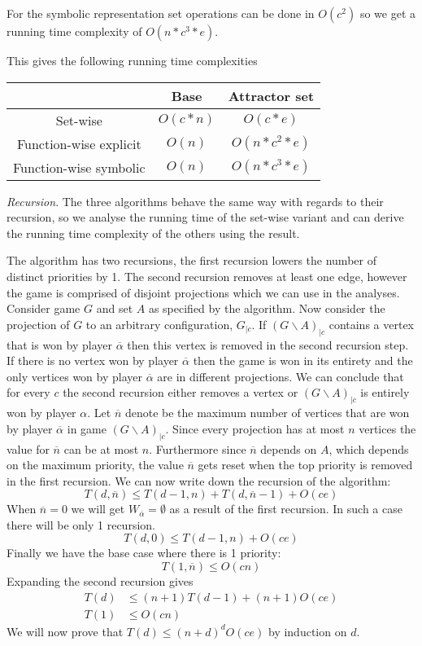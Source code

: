 For the symbolic representation set operations can be done in $O(c^2)$ so we get a running time complexity of $O(n*c^3*e)$.

This gives the following running time complexities\\
\begin{center}
	\begin{tabular}{|c|c|c|}
		\hline 
		& Base & Attractor set \\ 
		\hline 
		Set-wise & $O(c*n)$ & $O(c*e)$  \\ 
		\hline 
		Function-wise explicit & $O(n)$ &  $O(n*c^2*e)$ \\ 
		\hline 
		Function-wise symbolic & $O(n)$ &  $O(n* c^3*e)$ \\ 
		\hline 
	\end{tabular} 
\end{center}

\textit{Recursion}. The three algorithms behave the same way with regards to their recursion, so we analyse the running time of the set-wise variant and can derive the running time complexity of the others using the result.

The algorithm has two recursions, the first recursion lowers the number of distinct priorities by 1. The second recursion removes at least one edge, however the game is comprised of disjoint projections which we can use in the analyses. Consider game $G$ and set $A$ as specified by the algorithm. Now consider the projection of $G$ to an arbitrary configuration, $G_{|c}$. If $(G\backslash A)_{|c}$ contains a vertex that is won by player $\overline{\alpha}$ then this vertex is removed in the second recursion step. If there is no vertex won by player $\overline{\alpha}$ then the game is won in its entirety and the only vertices won by player $\overline{\alpha}$ are in different projections. We can conclude that for every $c$ the second recursion either removes a vertex or $(G\backslash A)_{|c}$ is entirely won by player $\alpha$. Let $\overline{n}$ denote be the maximum number of vertices that are won by player $\overline{\alpha}$ in game $(G\backslash A)_{|c}$. Since every projection has at most $n$ vertices the value for $\overline{n}$ can be at most $n$. Furthermore since $\overline{n}$ depends on $A$, which depends on the maximum priority, the value $\overline{n}$ gets reset when the top priority is removed in the first recursion. We can now write down the recursion of the algorithm:
\[ T(d,\overline{n}) \leq T(d-1,n) + T(d, \overline{n} - 1) + O(ce) \]
When $\overline{n} = 0$ we will get $W_{\overline{\alpha}} = \emptyset$ as a result of the first recursion. In such a case there will be only 1 recursion.
\[ T(d,0) \leq T(d-1,n) + O(ce) \]
Finally we have the base case where there is 1 priority:
\[ T(1, \overline{n}) \leq O(cn) \]
Expanding the second recursion gives
\begin{align*}
T(d) &\leq (n+1)T(d-1) + (n+1)O(ce)\\
T(1) &\leq O(cn)
\end{align*}
We will now prove that $T(d) \leq (n+d)^dO(ce)$ by induction on $d$.

